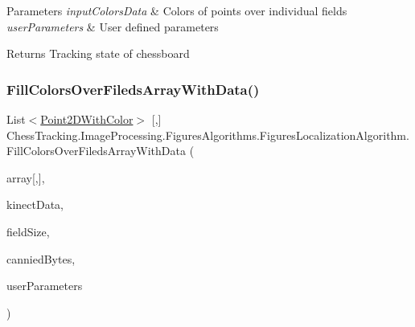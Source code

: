 \begin{DoxyParams}{Parameters}
{\em input\+Colors\+Data} & Colors of points over individual fields\\
\hline
{\em user\+Parameters} & User defined parameters\\
\hline
\end{DoxyParams}
\begin{DoxyReturn}{Returns}
Tracking state of chessboard
\end{DoxyReturn}
\mbox{\label{class_chess_tracking_1_1_image_processing_1_1_figures_algorithms_1_1_figures_localization_algorithm_a5a56335c222661b583bc3600df741531}} 
\subsubsection{\texorpdfstring{FillColorsOverFiledsArrayWithData()}{FillColorsOverFiledsArrayWithData()}}
{\footnotesize\ttfamily List$<$\mbox{\hyperlink{struct_chess_tracking_1_1_image_processing_1_1_pipeline_data_1_1_point2_d_with_color}{Point2\+D\+With\+Color}}$>$ \mbox{[},\mbox{]} Chess\+Tracking.\+Image\+Processing.\+Figures\+Algorithms.\+Figures\+Localization\+Algorithm.\+Fill\+Colors\+Over\+Fileds\+Array\+With\+Data (\begin{DoxyParamCaption}\item[{List$<$ \mbox{\hyperlink{struct_chess_tracking_1_1_image_processing_1_1_pipeline_data_1_1_point2_d_with_color}{Point2\+D\+With\+Color}} $>$}]{array\mbox{[},\mbox{]},  }\item[{\mbox{\hyperlink{class_chess_tracking_1_1_image_processing_1_1_pipeline_data_1_1_kinect_data}{Kinect\+Data}}}]{kinect\+Data,  }\item[{double}]{field\+Size,  }\item[{byte \mbox{[}$\,$\mbox{]}}]{cannied\+Bytes,  }\item[{\mbox{\hyperlink{class_chess_tracking_1_1_image_processing_1_1_pipeline_data_1_1_user_defined_parameters}{User\+Defined\+Parameters}}}]{user\+Parameters }\end{DoxyParamCaption})\hspace{0.3cm}{\ttfamily [private]}}



